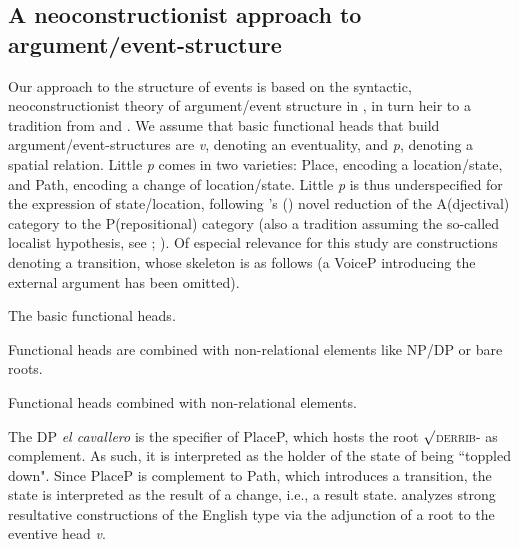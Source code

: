 \documentclass[output=paper,colorlinks,citecolor=brown,
]{langscibook}
\begin{document}
\subsection{A neoconstructionist approach to argument/event-structure}\label{sec:acedomatellan:4-1}

Our approach to the structure of events is based on the syntactic, neoconstructionist theory of argument/event structure in \citet{Acedo-Matellan2016}, in turn heir to a tradition from \citet{HaleAndKeyser1993, HaleAndKeyser2002} and \citet{Mateu2002}. We assume that basic functional heads that build argument/event-structures are \textit{v}, denoting an eventuality, and \textit{p}, denoting a spatial relation. Little \textit{p} comes in two varieties: Place, encoding a location/state, and Path, encoding a change of location/state. Little \textit{p} is thus underspecified for the expression of state/location, following \citeauthor{Mateu2002}'s (\citeyear{Mateu2002}) novel reduction of the A(djectival) category to the P(repositional) category (also a tradition assuming the so-called localist hypothesis, see \citealt{Gruber1965}; \citealt{Jackendoff1983}). Of especial relevance for this study are constructions denoting a transition, whose skeleton is as follows (a VoiceP introducing the external argument has been omitted).


\ea The basic functional heads.\\
\z

\noindent Functional heads are combined with non-relational elements like NP/DP or bare roots.

\ea Functional heads combined with non-relational elements.\\
\z

\noindent The DP \textit{el cavallero} is the specifier of PlaceP, which hosts the root $\surd$\textsc{derrib}- as complement. As such, it is interpreted as the holder of the state of being ``toppled down". Since PlaceP is complement to Path, which introduces a transition, the state is interpreted as the result of a change, i.e., a result state. \citet{Acedo-Matellan2016} analyzes strong resultative constructions of the English type via the adjunction of a root to the eventive head \textit{v}.
\end{document}
